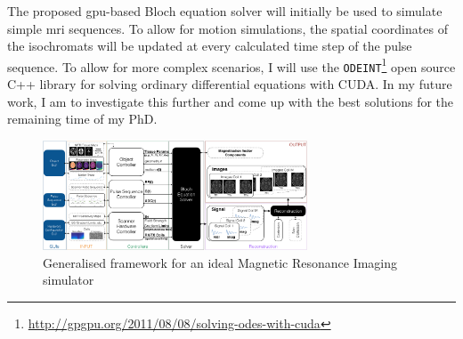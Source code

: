 \hfill

The proposed \ac{gpu}-based Bloch equation solver will initially be used to simulate simple \ac{mri} sequences.
To allow for motion simulations, the spatial coordinates of the isochromats will be updated at every calculated time step of the pulse sequence.
To allow for more complex scenarios, I will use the \texttt{ODEINT}\footnote{\url{http://gpgpu.org/2011/08/08/solving-odes-with-cuda}} open source C++ library for solving ordinary differential equations with CUDA.
In my future work, I am to investigate this further and come up with the best solutions for the remaining time of my PhD.


\begin{figure}[ht]
    \centering
    \includegraphics[angle=90,width=0.7\textwidth, keepaspectratio]{images/mri/globalFramework}
    \caption{Generalised framework for an ideal Magnetic Resonance Imaging simulator}
    \label{fig:globalFramework}
\end{figure}